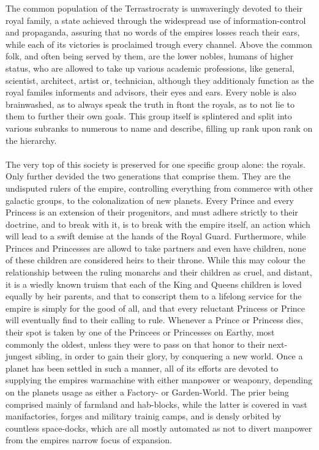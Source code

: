 \documentclass[a4paper,12pt]{book}
\begin{document}
The common population of the Terrastrocraty is unwaveringly devoted to their royal family, a state achieved through the widespread use of information-control and propaganda, assuring that no words of the empires losses reach their ears, while each of its victories is proclaimed trough every channel. Above the common folk, and often being served by them, are the lower nobles, humans of higher status, who are allowed to take up various academic professions, like general, scientist, architect, artist or, technician, although they additionaly function as the royal familes informents and advisors, their eyes and ears. Every noble is also brainwashed, as to always speak the truth in ftont the royals, as to not lie to them to further their own goals. This group itself is splintered and split into various subranks to numerous to name and describe, filling up rank upon rank on the hierarchy.\\
\\
The very top of this society is preserved for one specific group alone: the royals. Only further devided the two generations that comprise them. They are the undisputed rulers of the empire, controlling everything from commerce with other galactic groups, to the colonalization of new planets. Every Prince and every Princess is an extension of their progenitors, and must adhere strictly to their doctrine, and to break with it, is to break with the empire itself, an action which will lead to a swift demise at the hands of the Royal Guard. Furthermore, while Princes and Princesses are allowd to take partners and even have children, none of these children are considered heirs to their throne. While this may colour the relationship between the ruling monarchs and their children as cruel, and distant, it is a wiedly known truism that each of the King and Queens children is loved equally by heir parents, and that to conscript them to a lifelong service for the empire is simply for the good of all, and that every reluctant Princess or Prince will eventually find to their calling to rule. Whenever a Prince or Princess dies, their spot is taken by one of the Princees or Princesses on Earthy, most commonly the oldest, unless they were to pass on that honor to their next-jungest sibling, in order to gain their glory, by conquering a new world. Once a planet has been settled in such a manner, all of its efforts are devoted to supplying the empires warmachine with either manpower or weaponry, depending on the planets usage as either a Factory- or Garden-World. The prier being comprised mainly of farmland and hab-blocks, while the latter is covered in vast manifactories, forges and military trainig camps, and is densly orbited by countless space-docks, which are all mostly automated as not to divert manpower from the empires narrow focus of expansion.\\
\end{document}
